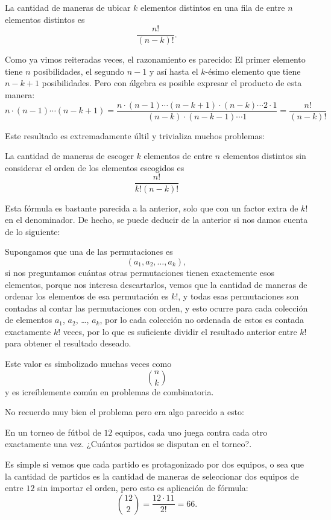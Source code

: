 \begin{example}
	La cantidad de maneras de ubicar $k$
	elementos distintos en una fila de entre
	$n$ elementos distintos es
	\[\frac{n!}{(n - k)!}.\]
\end{example}
Como ya vimos reiteradas veces, el razonamiento
es parecido:
El primer elemento tiene $n$ posibilidades,
el segundo $n - 1$ y así hasta
el $k$-ésimo elemento que tiene $n - k + 1$
posibilidades.
Pero con álgebra es posible expresar el
producto de esta manera:
\[n \cdot (n - 1) \cdots (n - k + 1) = \frac{n \cdot (n - 1) \cdots (n - k + 1) \cdot (n - k) \cdots 2 \cdot 1}{(n - k) \cdot (n - k - 1) \cdots 1} = \frac{n!}{(n - k)!}\]

Este resultado es extremadamente últil y trivializa
muchos problemas:
\begin{example}
	La cantidad de maneras de escoger $k$
	elementos de entre $n$ elementos distintos
	sin considerar el orden de los elementos escogidos
	es
	\[\frac{n!}{k!(n - k)!}\]
\end{example}
Esta fórmula es bastante parecida a la anterior,
solo que con un factor extra de $k!$ en el denominador.
De hecho, se puede deducir de la anterior si nos
damos cuenta de lo siguiente:

Supongamos que una de las permutaciones es
\[(a_1, a_2, \dots, a_k),\]
si nos preguntamos cuántas otras permutaciones
tienen exactemente esos elementos, porque
nos interesa descartarlos, vemos que la cantidad
de maneras de ordenar los elementos
de esa permutación es $k!$, y todas esas permutaciones
son contadas al contar las permutaciones con orden,
y esto ocurre para cada colección de
elementos $a_1$, $a_2$, \dots, $a_k$, por lo
cada colección no ordenada de estos
es contada exactamente $k!$ veces, por lo que
es suficiente dividir el resultado anterior
entre $k!$ para obtener el resultado deseado.

Este valor es simbolizado muchas veces como
\[n \choose k\]
y es icreíblemente común en problemas de combinatoria.

No recuerdo muy bien el problema pero era algo
parecido a esto:
\begin{example}
	En un torneo de fútbol de $12$ equipos, cada
	uno juega contra cada otro exactamente una vez.
	¿Cuántos partidos se disputan en el torneo?.
\end{example}
Es simple si vemos que cada partido
es protagonizado por dos equipos,
o sea que la cantidad de partidos
es la cantidad de maneras de seleccionar dos equipos
de entre $12$ sin importar el orden, pero esto
es aplicación de fórmula:
\[{12\choose{2}} = \frac{12 \cdot 11 }{2!} = 66.\]

